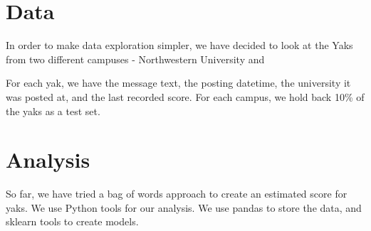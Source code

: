 \documentclass{sigchi}
\begin{document}
\section{Data}

In order to make data exploration simpler, we have decided to look at the Yaks from two different campuses - Northwestern University and %

For each yak, we have the message text, the posting datetime, the university it was posted at, and the last recorded score. For each campus, we hold back 10\% of the yaks as a test set.

\section{Analysis}

So far, we have tried a bag of words approach to create an estimated score for yaks. We use Python tools for our analysis. We use pandas to store the data, and sklearn tools to create models.





\end{document}
